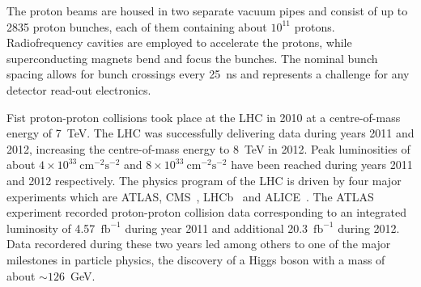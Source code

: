 The proton beams are  housed in two separate vacuum pipes and consist of up to 2835 proton bunches, each
of them containing about $10^{11}$ protons. 
Radiofrequency cavities are employed  to accelerate the protons,
while superconducting magnets bend and focus the bunches.
The nominal bunch spacing allows for bunch crossings  every 25~ns and represents a challenge for any detector read-out electronics.

Fist proton-proton collisions took place at the LHC in 2010 at a centre-of-mass  energy of 7~TeV. 
The LHC was successfully delivering data during  years 2011 and 2012, increasing the  centre-of-mass  energy to 8~TeV in 2012.
Peak luminosities of about $4\times10^{33} ~ \text{cm}^{-2}\text{s}^{-2}$ and $8\times10^{33} ~ \text{cm}^{-2}\text{s}^{-2}$  have been reached 
during years 2011 and 2012 respectively.
The physics program of the LHC is driven by four major experiments which are ATLAS, CMS~\cite{cms},
LHCb~\cite{lhcb} and ALICE~\cite{alice}. 
The ATLAS experiment recorded proton-proton collision data corresponding to an integrated luminosity of 4.57~$\text{fb}^{-1}$ 
during year 2011 and additional  20.3~$\text{fb}^{-1}$ during 2012.
Data recordered during  these two years  led among others to one of the major milestones
 in particle physics, the discovery of  a Higgs boson with a mass of about $\sim 126$~GeV.





